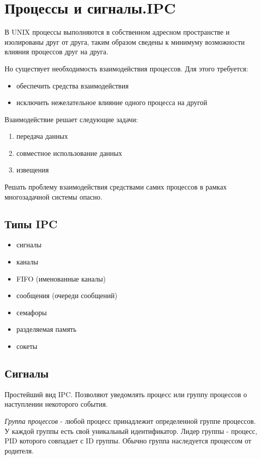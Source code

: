 \chapter{Процессы и сигналы.IPC}

В UNIX процессы выполняются в собственном адресном пространстве и изолированы друг от друга, таким образом сведены к минимуму
возможности влияния процессов друг на друга.

Но существует необходимость взаимодействия процессов. Для этого требуется:
\begin{itemize}
\item обеспечить средства взаимодействия
\item исключить нежелательное влияние одного процесса на другой
\end{itemize}

Взаимодействие решает следующие задачи:
\begin{enumerate}
\item передача данных
\item совместное использование данных
\item извещения
\end{enumerate}

Решать проблему взаимодействия средствами самих процессов в рамках многозадачной системы опасно.

\section{Типы IPC}
\begin{itemize}
 \item сигналы
 \item каналы
 \item FIFO (именованные каналы)
 \item сообщения (очереди сообщений)
 \item семафоры
 \item разделяемая память
 \item сокеты
\end{itemize}
       
\section{Сигналы}

Простейший вид IPC. Позволяют уведомлять процесс или группу процессов о наступлении некоторого события.

\emph{Группа процессов} - любой процесс принадлежит определенной группе процессов. У каждой группы есть свой уникальный идентификатор. Лидер группы - процесс, PID которого совпадает с ID группы. Обычно группа наследуется процессом от родителя.

